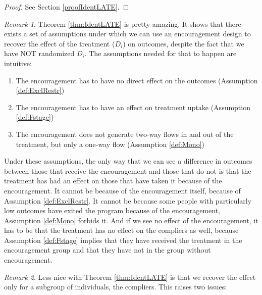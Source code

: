 \documentclass[
]{book}
\providecommand{\tightlist}{%
  \setlength{\itemsep}{0pt}\setlength{\parskip}{0pt}}
\theoremstyle{definition}
\theoremstyle{definition}
\theoremstyle{definition}
\theoremstyle{definition}
\theoremstyle{remark}
\newtheorem*{remark}{Remark}
\begin{document}
\begin{proof}
\iffalse{} {Proof. } \fi{}See Section \ref{proofIdentLATE}.
\end{proof}

\begin{remark}
\iffalse{} {Remark. } \fi{}Theorem \ref{thm:IdentLATE} is pretty amazing.
It shows that there exists a set of assumptions under which we can use an encouragement design to recover the effect of the treatment (\(D_i\)) on outcomes, despite the fact that we have NOT randomized \(D_i\).
The assumptions needed for that to happen are intuitive:
\end{remark}

\begin{enumerate}
\def\labelenumi{\arabic{enumi}.}
\tightlist
\item
  The encouragement has to have no direct effect on the outcomes (Assumption \ref{def:ExclRestr})
\item
  The encouragement has to have an effect on treatment uptake (Assumption \ref{def:Fstage})
\item
  The encouragement does not generate two-way flows in and out of the treatment, but only a one-way flow (Assumption \ref{def:Mono})
\end{enumerate}

Under these assumptions, the only way that we can see a difference in outcomes between those that receive the encouragement and those that do not is that the treatment has had an effect on those that have taken it because of the encouragement.
It cannot be because of the encouragement itself, because of Assumption \ref{def:ExclRestr}.
It cannot be because some people with particularly low outcomes have exited the program because of the encouragement, Assumption \ref{def:Mono} forbids it.
And if we see no effect of the encouragement, it has to be that the treatment has no effect on the compliers as well, because Assumption \ref{def:Fstage} implies that they have received the treatment in the encouragement group and that they have not in the group without encouragement.

\begin{remark}
\iffalse{} {Remark. } \fi{}Less nice with Theorem \ref{thm:IdentLATE} is that we recover the effect only for a subgroup of individuals, the compliers.
This raises two issues:
\end{remark}
\end{document}
